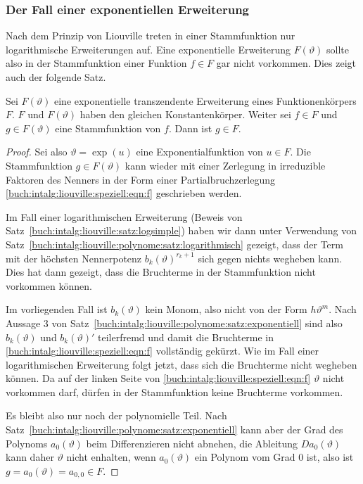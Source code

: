 %
%
\subsubsection{Der Fall einer exponentiellen Erweiterung}
Nach dem Prinzip von Liouville treten in einer Stammfunktion nur
logarithmische Erweiterungen auf.
Eine exponentielle Erweiterung $F(\vartheta)$ sollte also in der
Stammfunktion einer Funktion $f\in F$ gar nicht vorkommen.
Dies zeigt auch der folgende Satz.

\begin{satz}
\label{buch:intalg:liouville:satz:expsimple}
Sei $F(\vartheta)$ eine exponentielle transzendente Erweiterung eines
Funktionenkörpers $F$.
$F$ und $F(\vartheta)$ haben den gleichen Konstantenkörper.
Weiter sei $f\in F$ und $g\in F(\vartheta)$ eine Stammfunktion von $f$.
Dann ist $g\in F$.
\end{satz}

\begin{proof}
Sei also $\vartheta = \exp(u)$ eine Exponentialfunktion von $u\in F$.
Die Stammfunktion $g\in F(\vartheta)$ kann wieder mit einer Zerlegung
in irreduzible Faktoren des Nenners in der Form einer Partialbruchzerlegung
\eqref{buch:intalg:liouville:speziell:eqn:f}
geschrieben werden.

Im Fall einer logarithmischen Erweiterung
(Beweis von Satz~\ref{buch:intalg:liouville:satz:logsimple})
haben wir dann unter Verwendung von
Satz~\ref{buch:intalg:liouville:polynome:satz:logarithmisch}
gezeigt, dass der Term mit der höchsten Nennerpotenz $b_k(\vartheta)^{r_k+1}$
sich gegen nichts wegheben kann.
Dies hat dann gezeigt, dass die Bruchterme in der Stammfunktion nicht
vorkommen können.

Im vorliegenden Fall ist $b_k(\vartheta)$ kein Monom, also nicht von
der Form $h\vartheta^m$.
Nach Aussage 3 von Satz~\ref{buch:intalg:liouville:polynome:satz:exponentiell}
sind also $b_k(\vartheta)$ und $b_k(\vartheta)'$ teilerfremd und damit
die Bruchterme in \eqref{buch:intalg:liouville:speziell:eqn:f}
vollständig gekürzt.
Wie im Fall einer logarithmischen Erweiterung folgt jetzt, dass sich
die Bruchterme nicht wegheben können.
Da auf der linken Seite von \eqref{buch:intalg:liouville:speziell:eqn:f}
$\vartheta$ nicht vorkommen darf, dürfen in der Stammfunktion keine 
Bruchterme vorkommen.

Es bleibt also nur noch der polynomielle Teil.
Nach Satz~\ref{buch:intalg:liouville:polynome:satz:exponentiell}
kann aber der Grad des Polynoms $a_0(\vartheta)$ beim Differenzieren
nicht abnehen, die Ableitung $Da_0(\vartheta)$ kann daher $\vartheta$
nicht enhalten, wenn $a_0(\vartheta)$ ein Polynom vom Grad 0 ist,
also ist $g=a_0(\vartheta)=a_{0,0}\in F$.
\end{proof}


